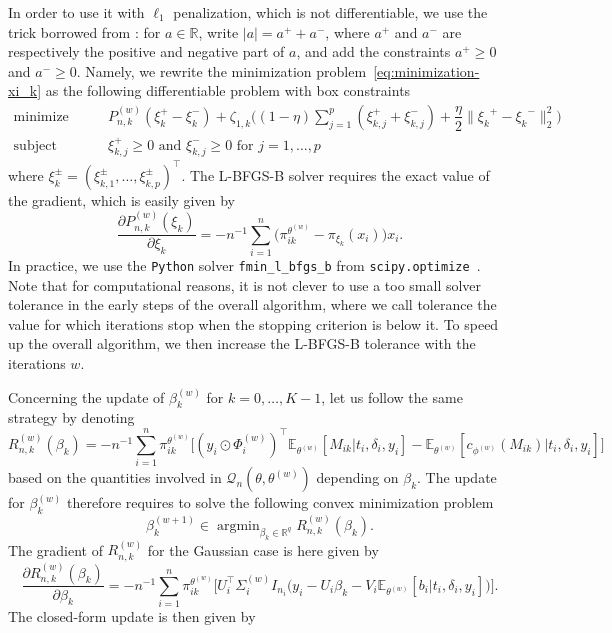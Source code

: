 \documentclass[11pt]{article}
\DeclareMathOperator{\argmin}{argmin}
\newcommand{\norm}[1]{\|#1\|}
\newcommand{\cQ}{\mathcal Q}
\newcommand{\R}{\mathds R}
\newcommand{\E}{\mathds E}
\begin{document}
In order to use it with $\ell_1$ penalization, which is not differentiable, we use the trick borrowed from \citet{andrew2007scalable}: for $a \in \R$, write $|a| = a^+ + a^-$, where $a^+$ and $a^-$ are respectively the positive and negative part of $a$, and add the constraints $a^+ \geq 0$ and $a^- \geq 0$.
Namely, we rewrite the minimization problem~\eqref{eq:minimization-xi_k} as the following differentiable problem with box constraints
\begin{equation}
  \label{eq:sub-problem-xi_k}
  \begin{split}
    \text{minimize}& \quad \quad P_{n, k}^{(w)}(\xi_k^+ - \xi_k^-) + \zeta_{1,k} \big((1 - \eta) \sum_{j=1}^p (\xi_{k,j}^+ + \xi_{k,j}^-) + \dfrac \eta 2 \norm{{\xi_k}^+ - {\xi_k}^-}_2^2 \big) \\
    \text{subject to}& \quad \quad \xi_{k,j}^+ \geq 0 \text{ and } \xi_{k,j}^- \geq 0 \text{ for } j = 1, \ldots, p
  \end{split} 
\end{equation}
where $\xi_k^\pm = (\xi_{k,1}^\pm, \ldots, \xi_{k,p}^\pm)^\top$. The L-BFGS-B solver requires the exact value of the gradient, which is easily given by
\begin{equation}
  \label{eq:grad-xi_k}
  \frac{\partial P_{n,k}^{(w)}(\xi_k)}{\partial \xi_k} = -n^{-1} \sum_{i=1}^n  \big(\pi_{ik}^{\theta^{(w)}} - \pi_{\xi_k}(x_i) \big) x_i.
\end{equation}
In practice, we use the \texttt{Python} solver \texttt{fmin\_l\_bfgs\_b} from \texttt{scipy.optimize}~\citep{virtanen2020scipy}. Note that for computational reasons, it is not clever to use a too small solver tolerance in the early steps of the overall algorithm, where we call tolerance the value for which iterations stop when the stopping criterion is below it. To speed up the overall algorithm, we then increase the L-BFGS-B tolerance with the iterations $w$.

Concerning the update of $\beta_k^{(w)}$ for $k=0, \ldots, K-1$, let us follow the same strategy by denoting
\begin{equation*}
  R^{(w)}_{n,k}(\beta_k) = -n^{-1} \sum_{i=1}^n \pi_{ik}^{\theta^{(w)}} \Big[ (y_i \odot \Phi_i^{(w)})^\top \E_{\theta^{(w)}}[ M_{ik} | t_i, \delta_i, y_i] - \E_{\theta^{(w)}}[ c_{\phi^{(w)}}(M_{ik}) | t_i, \delta_i, y_i] \Big]
\end{equation*}
based on the quantities involved in $\cQ_n(\theta, \theta^{(w)})$ depending on $\beta_k$. The update for $\beta_k^{(w)}$ therefore requires to solve the following convex minimization problem
\begin{equation}
  \label{eq:minimization-beta_k}
  \beta_k^{(w+1)} \in \argmin_{\beta_k \in \R^q} R^{(w)}_{n,k}(\beta_k).
\end{equation}
The gradient of $R_{n,k}^{(w)}$ for the Gaussian case is here given by
\begin{equation}
  \label{eq:grad-beta_k}
  \frac{\partial R_{n,k}^{(w)}(\beta_k)}{\partial \beta_k} = -n^{-1} \sum_{i=1}^n \pi_{ik}^{\theta^{(w)}} \Big[ U_{i}^\top \Sigma_i^{(w)} I_{n_{i}} \big(y_i - U_{i}\beta_k - V_{i} \E_{\theta^{(w)}}[ b_i | t_i, \delta_i, y_i]\big)\Big].
\end{equation}
The closed-form update is then given by
\end{document}
